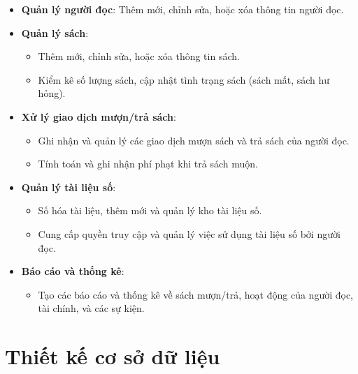 \documentclass[12pt]{article}
\begin{document}
\begin{itemize}
    \item \textbf{Quản lý người đọc}: Thêm mới, chỉnh sửa, hoặc xóa thông tin người đọc.
    \item \textbf{Quản lý sách}: 
    \begin{itemize}
        \item Thêm mới, chỉnh sửa, hoặc xóa thông tin sách.
        \item Kiểm kê số lượng sách, cập nhật tình trạng sách (sách mất, sách hư hỏng).
    \end{itemize}
    \item \textbf{Xử lý giao dịch mượn/trả sách}: 
    \begin{itemize}
        \item Ghi nhận và quản lý các giao dịch mượn sách và trả sách của người đọc.
        \item Tính toán và ghi nhận phí phạt khi trả sách muộn.
    \end{itemize}
    \item \textbf{Quản lý tài liệu số}: 
    \begin{itemize}
        \item Số hóa tài liệu, thêm mới và quản lý kho tài liệu số.
        \item Cung cấp quyền truy cập và quản lý việc sử dụng tài liệu số bởi người đọc.
    \end{itemize}
    \item \textbf{Báo cáo và thống kê}: 
    \begin{itemize}
        \item Tạo các báo cáo và thống kê về sách mượn/trả, hoạt động của người đọc, tài chính, và các sự kiện.
    \end{itemize}
\end{itemize}

\section{Thiết kế cơ sở dữ liệu}
\end{document}
